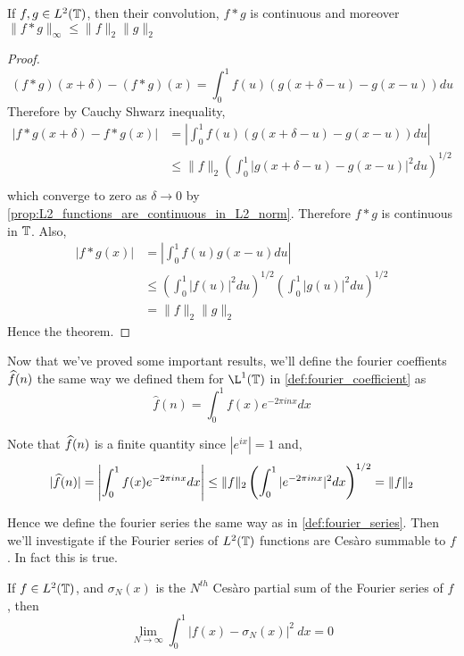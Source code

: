 \begin{proposition}
  \label{prop:convolution_of_L2_functions}
  If $f, g \in L^2(\mathbb T)$, then their convolution, $f*g$ is continuous and moreover $\|f*g\|_{\infty} \le \|f\|_2 \|g\|_2$
\end{proposition}
\begin{proof}
  $$(f*g)(x+\delta) - (f*g)(x) = \int_0^1 f(u)(g(x+\delta - u) - g(x-u)) du $$
  Therefore by Cauchy Shwarz inequality, 
  \begin{align*}
    |f*g(x+\delta) - f*g(x)| &= \left| \int_0^1 f(u) (g(x + \delta -u)- g(x-u)) du \right| \\
          &\le \|f\|_2 \left( \int_0^1|g(x+\delta - u) - g(x-u)|^2 du \right)^{1/2} \\
  \end{align*}
  which converge to zero as $\delta \to 0$ by \autoref{prop:L2_functions_are_continuous_in_L2_norm}. Therefore $f*g$ is continuous in $\mathbb T$.
  Also, 
  \begin{align*}
    |f*g(x)| &= \left| \int_0^1 f(u)g(x-u) du \right| \\
            &\le \left(\int_0^1 |f(u)|^2 du \right)^{1/2} \left(\int_0^1 |g(u)|^2 du \right)^{1/2} \\
            &= \|f\|_2 \|g\|_2
  \end{align*}
  Hence the theorem.
\end{proof}

 Now that we've proved some important results, we'll define the fourier coeffients $\widehat{f}(n)$ the same way we defined them for $\L^1(\T)$ in \autoref{def:fourier_coefficient} as 
$$\hat{f}(n) = \int_0^1 f(x)e^{-2\pi inx} dx$$

Note that $\widehat{f}(n)$ is a finite quantity since $|e^{ix}| = 1$ and,
$$ |\widehat{f}(n)| = \left| \int_0^1 f(x)e^{-2\pi inx} dx \right| \le \|f\|_2\left(\int_0^1 |e^{-2\pi inx}|^2 dx\right)^{1/2} = \|f\|_2 $$

Hence we define the fourier series the same way as in \autoref{def:fourier_series}. Then we'll investigate if the Fourier series of $L^2(\mathbb T)$ functions are Ces\`aro summable to $f$. In fact this is true.

\begin{theorem}
  If $f\in L^2(\mathbb T)$, and $\sigma_N(x)$ is the $N^{th}$ Ces\`aro partial sum of the Fourier series of $f$, then
  $$ \lim_{N \to \infty} \int_0^1 |f(x) - \sigma_N(x)|^2 \ dx = 0$$
\end{theorem}

